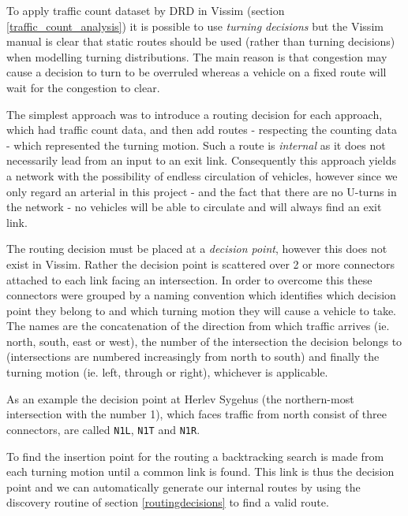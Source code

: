 To apply traffic count dataset by DRD in Vissim (section \ref{traffic_count_analysis}) it is possible to use \textit{turning decisions} but the Vissim manual is clear that static routes should be used (rather than turning decisions) when modelling turning distributions. The main reason is that congestion may cause a decision to turn to be overruled whereas a vehicle on a fixed route will wait for the congestion to clear. 

The simplest approach was to introduce a routing decision for each approach, which had traffic count data, and then add routes - respecting the counting data - which represented the turning motion. Such a route is \textit{internal} as it does not necessarily lead from an input to an exit link. Consequently this approach yields a network with the possibility of endless circulation of vehicles, however since we only regard an arterial in this project - and the fact that there are no U-turns in the network - no vehicles will be able to circulate and will always find an exit link.

The routing decision must be placed at a \textit{decision point}, however this does not exist in Vissim. Rather the decision point is scattered over 2 or more connectors attached to each link facing an intersection. In order to overcome this these connectors were grouped by a naming convention which identifies which decision point they belong to and which turning motion they will cause a vehicle to take. 
The names are the concatenation of the direction from which traffic arrives (ie. north, south, east or west), the number of the intersection the decision belongs to (intersections are numbered increasingly from north to south) and finally the turning motion (ie. left, through or right), whichever is applicable. 

As an example the decision point at Herlev Sygehus (the northern-most intersection with the number 1), which faces traffic from north consist of three connectors, are called \verb|N1L|, \verb|N1T| and \verb|N1R|.

To find the insertion point for the routing a backtracking search is made from each turning motion until a common link is found. This link is thus the decision point and we can automatically generate our internal routes by using the discovery routine of section \ref{routingdecisions} to find a valid route.

